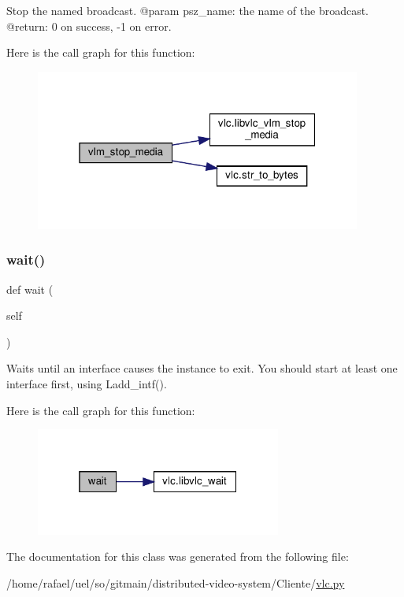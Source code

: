 \begin{DoxyVerb}Stop the named broadcast.
@param psz_name: the name of the broadcast.
@return: 0 on success, -1 on error.
\end{DoxyVerb}
 Here is the call graph for this function\+:
\nopagebreak
\begin{figure}[H]
\begin{center}
\leavevmode
\includegraphics[width=304pt]{classvlc_1_1_instance_a0b4acb6d5c4bcc6b134887a58079427d_cgraph}
\end{center}
\end{figure}
\mbox{\label{classvlc_1_1_instance_a9c98546f51afac69adc883ec79181283}} 
\subsubsection{\texorpdfstring{wait()}{wait()}}
{\footnotesize\ttfamily def wait (\begin{DoxyParamCaption}\item[{}]{self }\end{DoxyParamCaption})}

\begin{DoxyVerb}Waits until an interface causes the instance to exit.
You should start at least one interface first, using L{add_intf}().
\end{DoxyVerb}
 Here is the call graph for this function\+:
\nopagebreak
\begin{figure}[H]
\begin{center}
\leavevmode
\includegraphics[width=229pt]{classvlc_1_1_instance_a9c98546f51afac69adc883ec79181283_cgraph}
\end{center}
\end{figure}


The documentation for this class was generated from the following file\+:\begin{DoxyCompactItemize}
\item 
/home/rafael/uel/so/gitmain/distributed-\/video-\/system/\+Cliente/\hyperlink{vlc_8py}{vlc.\+py}\end{DoxyCompactItemize}
